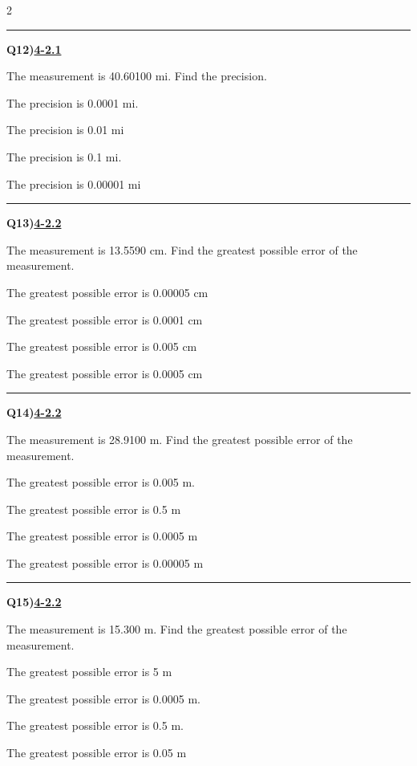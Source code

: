 \documentclass[11pt]{article}
\newenvironment{Qbox}[2]{%
  \par\medskip\noindent\begin{minipage}{\linewidth}%
  \hrule\medskip%
  \textbf{Q#1)}\hfill\textbf{\underline{#2}}\par\smallskip%
}{\par\end{minipage}\par\medskip}
\begin{document}
\begin{multicols}{2}
\begin{Qbox}{12}{4-2.1}
The measurement is 40.60100 mi. Find the precision.
\begin{choices}
  \item The precision is 0.0001 mi.
  \item The precision is 0.01 mi
  \item The precision is 0.1 mi.
  \item The precision is 0.00001 mi
\end{choices}
\end{Qbox}

\begin{Qbox}{13}{4-2.2}
The measurement is 13.5590 cm. Find the greatest possible error of the measurement.
\begin{choices}
  \item The greatest possible error is 0.00005 cm
  \item The greatest possible error is 0.0001 cm
  \item The greatest possible error is 0.005 cm
  \item The greatest possible error is 0.0005 cm
\end{choices}
\end{Qbox}

\begin{Qbox}{14}{4-2.2}
The measurement is 28.9100 m. Find the greatest possible error of the measurement.
\begin{choices}
  \item The greatest possible error is 0.005 m.
  \item The greatest possible error is 0.5 m
  \item The greatest possible error is 0.0005 m
  \item The greatest possible error is 0.00005 m
\end{choices}
\end{Qbox}

\begin{Qbox}{15}{4-2.2}
The measurement is 15.300 m. Find the greatest possible error of the measurement.
\begin{choices}
  \item The greatest possible error is 5 m
  \item The greatest possible error is 0.0005 m.
  \item The greatest possible error is 0.5 m.
  \item The greatest possible error is 0.05 m
\end{choices}
\end{Qbox}


\end{multicols}
\end{document}
